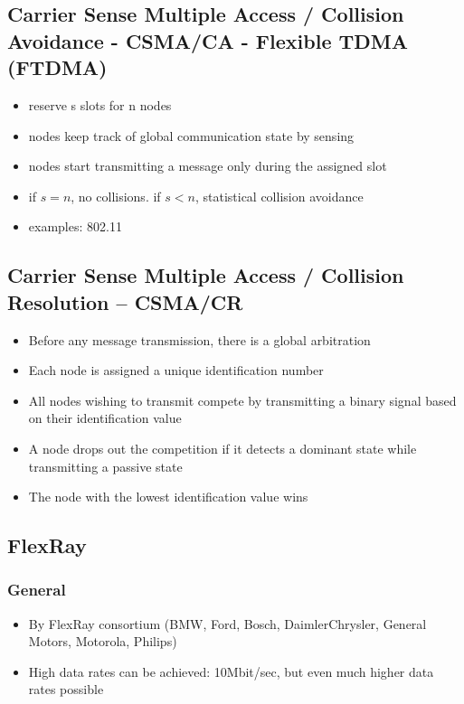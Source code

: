 \subsection{Carrier Sense Multiple Access / Collision Avoidance - CSMA/CA - Flexible TDMA (FTDMA)}

\begin{itemize}[noitemsep]
\item reserve s slots for n nodes
\item nodes keep track of global communication state by sensing
\item nodes start transmitting a message only during the assigned slot
\item if $s = n$, no collisions. if $s < n$, statistical collision avoidance
\item examples: 802.11
\end{itemize}



\subsection{Carrier Sense Multiple Access / Collision Resolution -- CSMA/CR}

\begin{itemize}[noitemsep]
\item Before any message transmission, there is a global arbitration
\item Each node is assigned a unique identification number
\item All nodes wishing to transmit compete by transmitting a binary signal based on their identification value
\item A node drops out the competition if it detects a dominant state while transmitting a passive state
\item The node with the lowest identification value wins
\end{itemize}




\subsection{FlexRay}

\subsubsection{General}
\begin{itemize}[noitemsep]
\item By FlexRay consortium (BMW, Ford, Bosch, 
DaimlerChrysler, General Motors, Motorola, Philips)
\item High data rates can be achieved: 10Mbit/sec, but even much higher data rates possible
\end{itemize}

